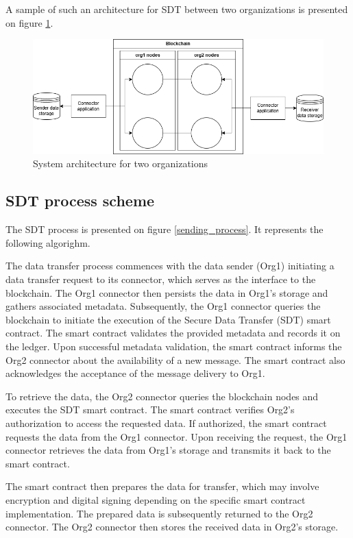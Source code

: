 \documentclass[10pt]{llncs}
\begin{document}
A sample of such an architecture for SDT between two organizations is presented on figure \ref{system_architecture}.

\begin{figure}
    \includegraphics[width=\textwidth]{system_architecture.png}
    \caption{System architecture for two organizations} \label{system_architecture}
\end{figure}

\subsection{SDT process scheme}

The SDT process is presented on figure \ref{sending_process}.
It represents the following algorighm.

The data transfer process commences with the data sender (Org1) initiating a data transfer request to its connector, which serves as the interface to the blockchain. 
The Org1 connector then persists the data in Org1's storage and gathers associated metadata. 
Subsequently, the Org1 connector queries the blockchain to initiate the execution of the Secure Data Transfer (SDT) smart contract. 
The smart contract validates the provided metadata and records it on the ledger. 
Upon successful metadata validation, the smart contract informs the Org2 connector about the availability of a new message. 
The smart contract also acknowledges the acceptance of the message delivery to Org1.

To retrieve the data, the Org2 connector queries the blockchain nodes and executes the SDT smart contract. 
The smart contract verifies Org2's authorization to access the requested data. 
If authorized, the smart contract requests the data from the Org1 connector. 
Upon receiving the request, the Org1 connector retrieves the data from Org1's storage and transmits it back to the smart contract.

The smart contract then prepares the data for transfer, which may involve encryption and digital signing depending on the specific smart contract implementation. 
The prepared data is subsequently returned to the Org2 connector. The Org2 connector then stores the received data in Org2's storage.
\end{document}
